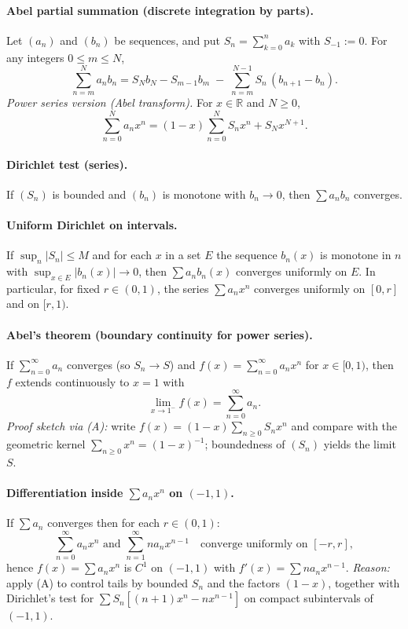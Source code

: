 \documentclass[12pt,a4paper]{article}
\theoremstyle{plain}
\theoremstyle{definition}
\theoremstyle{remark}
\theoremstyle{remark}
\begin{document}
\paragraph{Abel partial summation (discrete integration by parts).}
Let $(a_n)$ and $(b_n)$ be sequences, and put $S_n=\sum_{k=0}^n a_k$ with $S_{-1}:=0$.
For any integers $0\le m\le N$,
\[
\sum_{n=m}^N a_n b_n
= S_N b_N - S_{m-1} b_m \;-\; \sum_{n=m}^{N-1} S_n\,(b_{n+1}-b_n).
\]
\emph{Power series version (Abel transform).} For $x\in\mathbb{R}$ and $N\ge0$,
\[
\sum_{n=0}^N a_n x^n
= (1-x)\sum_{n=0}^N S_n x^n + S_N x^{N+1}.
\tag{A}
\]

\paragraph{Dirichlet test (series).}
If $(S_n)$ is bounded and $(b_n)$ is monotone with $b_n\to 0$, then $\sum a_n b_n$ converges.

\paragraph{Uniform Dirichlet on intervals.}
If $\sup_n |S_n|\le M$ and for each $x$ in a set $E$ the sequence $b_n(x)$ is monotone in $n$ with
$\sup_{x\in E} |b_n(x)|\to 0$, then $\sum a_n b_n(x)$ converges uniformly on $E$.
In particular, for fixed $r\in(0,1)$, the series $\sum a_n x^n$ converges uniformly on $[0,r]$ and on $[r,1)$.

\paragraph{Abel’s theorem (boundary continuity for power series).}
If $\sum_{n=0}^\infty a_n$ converges (so $S_n\to S$) and $f(x)=\sum_{n=0}^\infty a_n x^n$ for $x\in[0,1)$,
then $f$ extends continuously to $x=1$ with
\[
\lim_{x\to 1^-} f(x)=\sum_{n=0}^\infty a_n.
\]
\emph{Proof sketch via (A):} write $f(x)=(1-x)\sum_{n\ge0} S_n x^n$ and compare with the geometric kernel
$\sum_{n\ge0} x^n=(1-x)^{-1}$; boundedness of $(S_n)$ yields the limit $S$.

\paragraph{Differentiation inside $\sum a_n x^n$ on $(-1,1)$.}
If $\sum a_n$ converges then for each $r\in(0,1)$:
\[
\sum_{n=0}^\infty a_n x^n \text{ and } \sum_{n=1}^\infty n a_n x^{n-1}
\quad\text{converge uniformly on } [-r,r],
\]
hence $f(x)=\sum a_n x^n$ is $C^1$ on $(-1,1)$ with $f'(x)=\sum n a_n x^{n-1}$.
\emph{Reason:} apply (A) to control tails by bounded $S_n$ and the factors $(1-x)$, together with Dirichlet’s test
for $\sum S_n [(n+1)x^n-nx^{n-1}]$ on compact subintervals of $(-1,1)$.
\end{document}
